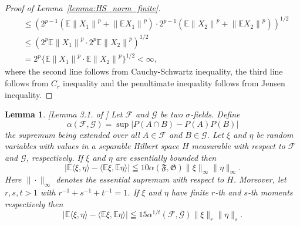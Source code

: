 \documentclass[11pt]{article}
\newcommand{\bE}{\mathbb{E}}
\theoremstyle{plain}
\newtheorem{lemma}[theorem]{Lemma}
\theoremstyle{definition}
\theoremstyle{remark}
\begin{document}
\begin{appendix}
\begin{proof}[Proof of Lemma~\ref{lemma:HS_norm_finite}]
\begin{align*}
         &\leq \left(2^{p-1}(\bE \left\|X_1\right\|^p+\left\|\bE X_1\right\|^p)\cdot 2^{p-1}(\bE \left\|X_2\right\|^p+\left\|\bE X_2\right\|^p)\right)^{1/2}\\
         &\leq \left(2^p \bE \left\|X_1\right\|^p \cdot 2^p \bE \left\|X_2\right\|^p\right)^{1/2}\\
         &=2^p \{\bE\left\|X_1\right\|^p \cdot \bE \left\|X_2\right\|^p\}^{1/2}<\infty,
    \end{align*}
    where the second line follows from Cauchy-Schwartz inequality, the third line follows from $C_r$ inequality and the penultimate inequality follows from Jensen inequality.
\end{proof}

\begin{lemma}\label{lemma:dehling_3.1}[Lemma 3.1. of \cite{dehling1983limit}]
  Let $\mathcal{F}$ and $\mathcal{G}$ be two $\sigma$-fields. Define
$$
\alpha(\mathcal{F},\mathcal{G})=\sup |P(A \cap B)-P(A) P(B)|
$$
the supremum being extended over all $A \in \mathcal{F}$ and $B \in \mathcal{G}$. Let $\xi$ and $\eta$ be random variables with values in a separable Hilbert space $H$ measurable  with respect to $\mathcal{F}$ and $\mathcal{G}$, respectively. If $\xi$ and $\eta$ are essentially bounded then
$$
|\bE\langle \xi, \eta\rangle-\langle \bE \xi,\bE \eta\rangle| \leqq 10 \alpha(\mathfrak{F}, \mathfrak{G})\|\xi\|_{\infty}\|\eta\|_{\infty} .
$$
Here $\|\cdot\|_{\infty}$ denotes the essential supremum with respect to $H$. Moreover, let $r, s, t>1$ with $r^{-1}+s^{-1}+t^{-1}=1$. If $\xi$ and $\eta$ have finite $r$-th and $s$-th moments respectively then
$$
|\bE\langle \xi, \eta\rangle-\langle \bE \xi,\bE \eta\rangle| \leqq 15 \alpha^{1 / t}(\mathcal{F}, \mathcal{G})\|\xi\|_r\|\eta\|_{s} .
$$  
\end{lemma}


\end{appendix}
\end{document}
